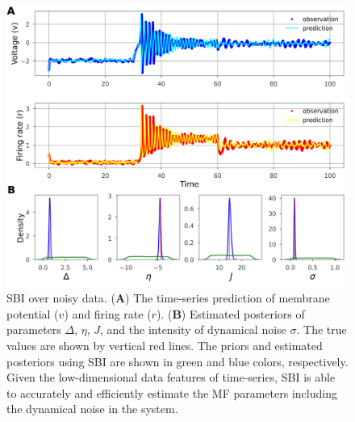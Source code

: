 \documentclass[preprint,11pt,authoryear]{elsarticle}
\begin{document}
\begin{figure}[ht]
    \centering
    \includegraphics[width=\linewidth]{Figs/FigS7.png}
    \renewcommand{\thefigure}{S\arabic{figure}}
    \caption{SBI over noisy data.  (\textbf{A}) The time-series prediction of membrane potential ($v$) and firing rate ($r$). (\textbf{B}) Estimated posteriors of parameters $\Delta$, $\eta$, $J$, and the intensity of dynamical noise $\sigma$. The true values are shown by vertical red lines. The priors and estimated posteriors using SBI are shown in green and blue colors, respectively. Given the low-dimensional data features of time-series, SBI is able to accurately and efficiently estimate the MF parameters including the dynamical noise in the system. }
    \label{fig:SBI_SDE_Istep_RV_NoiseEstimation}
\end{figure}
\end{document}
